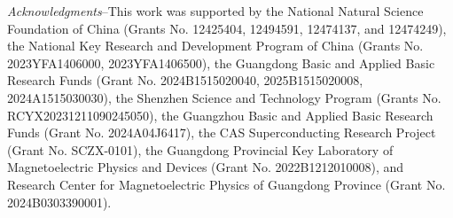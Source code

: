 \documentclass[prx,aps,twocolumn,preprintnumbers,amsmath,amssymb,superscriptaddress,showpacs]{revtex4-2}
\begin{document}
{\it Acknowledgments}--This work was supported by the National Natural Science Foundation of China (Grants No. 12425404, 12494591, 12474137, and 12474249), the National Key Research and Development Program of China (Grants No. 2023YFA1406000, 2023YFA1406500), the Guangdong Basic and Applied Basic Research Funds (Grant No. 2024B1515020040, 2025B1515020008, 2024A1515030030), the Shenzhen Science and Technology Program (Grants No. RCYX20231211090245050), the Guangzhou Basic and Applied Basic Research Funds (Grant No. 2024A04J6417), the CAS Superconducting Research Project (Grant No. SCZX-0101), the Guangdong Provincial Key Laboratory of Magnetoelectric Physics and Devices (Grant No. 2022B1212010008), and Research Center for Magnetoelectric Physics of Guangdong Province (Grant No. 2024B0303390001). 



\end{document}

